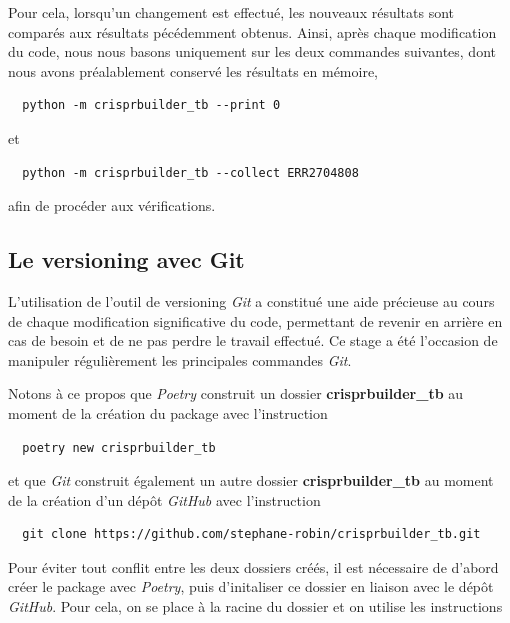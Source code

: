 \documentclass[twoside,a4paper,11pt,frenchb,openany]{report}
\begin{document}
Pour cela, lorsqu'un changement est effectué, les nouveaux résultats sont comparés aux résultats pécédemment obtenus. Ainsi, après chaque modification du code, nous nous basons uniquement sur les deux commandes suivantes, dont nous avons préalablement conservé les résultats en mémoire,

\begin{verbatim}  python -m crisprbuilder_tb --print 0\end{verbatim}

et 

\begin{verbatim}  python -m crisprbuilder_tb --collect ERR2704808\end{verbatim}

afin de procéder aux vérifications.



\subsection{Le versioning avec Git}

L'utilisation de l'outil de versioning \textit{Git} a constitué une aide précieuse au cours de chaque modification significative du code, permettant de revenir en arrière en cas de besoin et de ne pas perdre le travail effectué. Ce stage a été l'occasion de manipuler régulièrement les principales commandes \textit{Git}. 

Notons à ce propos que \textit{Poetry} construit un dossier \textbf{crisprbuilder\_tb} au moment de la création du package avec l'instruction

 \begin{verbatim}  poetry new crisprbuilder_tb\end{verbatim}

et que \textit{Git} construit également un autre dossier \textbf{crisprbuilder\_tb} au moment de la création d'un dépôt \textit{GitHub} avec l'instruction

\begin{verbatim}  git clone https://github.com/stephane-robin/crisprbuilder_tb.git\end{verbatim}

Pour éviter tout conflit entre les deux dossiers créés, il est nécessaire de d'abord créer le package avec \textit{Poetry}, puis d'initaliser ce dossier en liaison avec le dépôt \textit{GitHub}. Pour cela, on se place à la racine du dossier et on utilise les instructions
\end{document}
